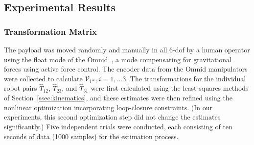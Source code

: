 \documentclass[letterpaper, 10 pt, journal, twoside]{IEEEtran}
\newcommand{\twist}{{\mathcal V}}
\begin{document}

\subsection{Experimental Results}
\subsubsection{Transformation Matrix}
The payload was moved randomly and manually in all 6-dof by a human operator using the float mode of the Omnid~\cite{elwin2022human}, a mode compensating for gravitational forces using active force control. 
The encoder data from the Omnid manipulators were collected to calculate $\twist_{i*}, i = 1, \ldots 3$.
The transformations for the individual robot pairs $\hat{T}_{12}$, $\hat{T}_{23}$, and $\hat{T}_{31}$ were first calculated using the least-squares methods of Section~\ref{ssec:kinematics}, and these estimates were then refined using the nonlinear optimization incorporating loop-closure constraints. (In our experiments, this second optimization step did not change the estimates significantly.) Five independent trials were conducted, each consisting of ten seconds of data (1000 samples) for the estimation process.
\end{document}
